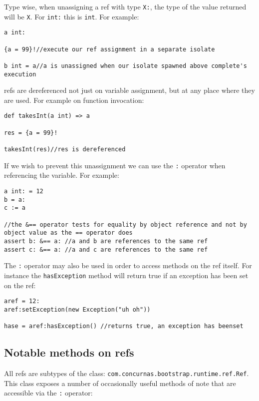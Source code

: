 \documentclass[conc-doc]{subfiles}
\begin{document}
Type wise, when unassigning a ref with type \lstinline{X:}, the type of the value returned will be \lstinline{X}. For \lstinline{int:} this is \lstinline{int}. For example:

\begin{lstlisting}
a int:

{a = 99}!//execute our ref assignment in a separate isolate

b int = a//a is unassigned when our isolate spawned above complete's execution
\end{lstlisting}

refs are dereferenced not just on variable assignment, but at any place where they are used. For example on function invocation:

\begin{lstlisting}
def takesInt(a int) => a

res = {a = 99}!

takesInt(res)//res is dereferenced
\end{lstlisting}

If we wish to prevent this unassignment we can use the \lstinline{:} operator when referencing the variable. For example:

\begin{lstlisting}
a int: = 12
b = a:
c := a

//the &== operator tests for equality by object reference and not by object value as the == operator does
assert b: &== a: //a and b are references to the same ref
assert c: &== a: //a and c are references to the same ref
\end{lstlisting}

The \lstinline{:} operator may also be used in order to access methods on the ref itself. For instance the \lstinline{hasException} method will return true if an exception has been set on the ref:

\begin{lstlisting}
aref = 12:
aref:setException(new Exception("uh oh"))

hase = aref:hasException() //returns true, an exception has beenset
\end{lstlisting}


\subsection{Notable methods on refs}
All refs are subtypes of the class: \lstinline{com.concurnas.bootstrap.runtime.ref.Ref}. This class exposes a number of occasionally useful methods of note that are accessible via the \lstinline{:} operator:
\end{document}
